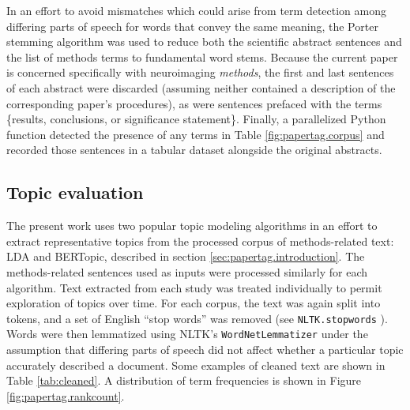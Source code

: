 In an effort to avoid mismatches which could arise from term detection among differing parts of speech for words that convey the same meaning, the Porter stemming algorithm \cite{M.F.Porter1980} was used to reduce both the scientific abstract sentences and the list of methods terms to fundamental word stems. Because the current paper is concerned specifically with neuroimaging \emph{methods}, the first and last sentences of each abstract were discarded (assuming neither contained a description of the corresponding paper's procedures), as were sentences prefaced with the terms \{results, conclusions, or significance statement\}. Finally, a parallelized Python function detected the presence of any terms in Table \ref{fig:papertag.corpus} and recorded those sentences in a tabular dataset alongside the original abstracts. 

\subsection{Topic evaluation}

The present work uses two popular topic modeling algorithms in an effort to extract representative topics from the processed corpus of methods-related text: LDA and BERTopic, described in section \ref{sec:papertag.introduction}. The methods-related sentences used as inputs were processed similarly for each algorithm. Text extracted from each study was treated individually to permit exploration of topics over time. For each corpus, the text was again split into tokens, and a set of English ``stop words'' was removed (see \texttt{NLTK.stopwords} \cite{BirdEtAl2009}). Words were then lemmatized using NLTK's \texttt{WordNetLemmatizer} under the assumption that differing parts of speech did not affect whether a particular topic accurately described a document. Some examples of cleaned text are shown in Table \ref{tab:cleaned}. A distribution of term frequencies is shown in Figure \ref{fig:papertag.rankcount}.


